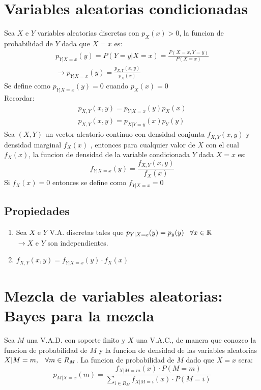 \documentclass[titlepage,a4paper]{article}
\begin{document}
\section{Variables aleatorias condicionadas}
Sea $X$ e $Y$ variables aleatorias discretas con $p_{X}(x)>0$, la funcion 
de probabilidad de $Y$ dada que $X=x$ es:
\begin{eqnarray*}
    p_{Y|X=x}(y) = P(Y=y|X=x) = \frac{P(X=x,Y=y)}{P(X=x)} \\
    \rightarrow p_{Y|X=x}(y)=\frac{p_{X,Y}(x,y)}{p_{X}(x)}
\end{eqnarray*}
Se define como $p_{Y|X=x}(y)=0$ cuando $p_{X}(x)=0$\\
Recordar:
\begin{eqnarray*}
    p_{X,Y}(x,y) = p_{Y|X=x}(y)p_{X}(x)\\
    p_{X,Y}(x,y) = p_{X|Y=y}(x)p_{Y}(y) 
\end{eqnarray*}
Sea $(X,Y)$ un vector aleatorio continuo con densidad conjunta $f_{X,Y}(x,y)$ y densidad marginal $f_{X}(x)$ 
, entonces para cualquier valor de $X$ con el cual $f_{X}(x)$, la funcion de densidad de la variable condicionada $Y$ dada $X=x$ es:
\begin{equation*}
    f_{Y|X=x}(y) = \frac{f_{X,Y}(x,y)}{f_{X}(x)}
\end{equation*}
Si $f_{X}(x) = 0$ entonces se define como $f_{Y|X=x}=0$
\subsection{Propiedades}
\begin{enumerate}
    \item Sea $X$ e $Y$ V.A. discretas tales que $p_{Y|X=x}(y)=p_{y}(y) \hspace{8px} \forall x \in \mathbb{R}$\\
    $\rightarrow X$ e $Y$ son independientes.
    \item $f_{X,Y}(x,y)=f_{Y|X=x}(y) \cdot f_{X}(x)$
\end{enumerate}
\section{Mezcla de variables aleatorias: Bayes para la mezcla}
Sea $M$ una V.A.D. con soporte finito y $X$ una V.A.C., de manera que conozco la funcion de probabilidad de $M$
y la funcion de densidad de las variables aleatorias $X|M=m, \hspace{8px} \forall m \in R_{M}$.
La funcion de probabilidad de $M$ dado que $X=x$ sera:
\begin{equation*}
    p_{M|X=x}(m) = \frac{f_{X|M=m}(x) \cdot P(M=m) }{\sum_{i \in R_{M}}f_{X|M=i}(x) \cdot P(M=i)}
\end{equation*}
\end{document}
